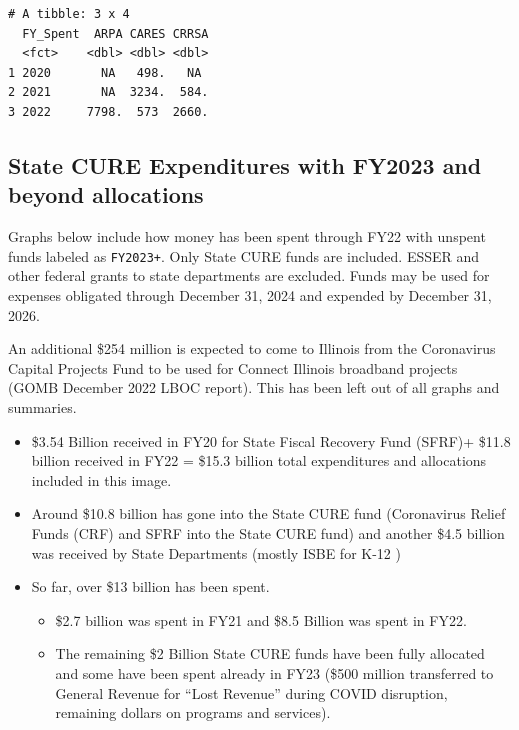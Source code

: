 \documentclass[
  letterpaper,
  DIV=11,
  numbers=noendperiod]{scrreport}
\begin{document}
\begin{verbatim}
# A tibble: 3 x 4
  FY_Spent  ARPA CARES CRRSA
  <fct>    <dbl> <dbl> <dbl>
1 2020       NA   498.   NA 
2 2021       NA  3234.  584.
3 2022     7798.  573  2660.
\end{verbatim}

\hypertarget{state-cure-expenditures-with-fy2023-and-beyond-allocations}{%
\subsection{State CURE Expenditures with FY2023 and beyond
allocations}\label{state-cure-expenditures-with-fy2023-and-beyond-allocations}}

Graphs below include how money has been spent through FY22 with unspent
funds labeled as \texttt{FY2023+}. Only State CURE funds are included.
ESSER and other federal grants to state departments are excluded. Funds
may be used for expenses obligated through December 31, 2024 and
expended by December 31, 2026.

An additional \$254 million is expected to come to Illinois from the
Coronavirus Capital Projects Fund to be used for Connect Illinois
broadband projects (GOMB December 2022 LBOC report). This has been left
out of all graphs and summaries.\\

\begin{itemize}
\item
  \$3.54 Billion received in FY20 for State Fiscal Recovery Fund (SFRF)+
  \$11.8 billion received in FY22 = \$15.3 billion total expenditures
  and allocations included in this image.
\item
  Around \$10.8 billion has gone into the State CURE fund (Coronavirus
  Relief Funds (CRF) and SFRF into the State CURE fund) and another
  \$4.5 billion was received by State Departments (mostly ISBE for K-12
  )
\item
  So far, over \$13 billion has been spent.

  \begin{itemize}
  \item
    \$2.7 billion was spent in FY21 and \$8.5 Billion was spent in FY22.
  \item
    The remaining \$2 Billion State CURE funds have been fully allocated
    and some have been spent already in FY23 (\$500 million transferred
    to General Revenue for ``Lost Revenue'' during COVID disruption,
    remaining dollars on programs and services).
  \end{itemize}
\end{itemize}
\end{document}
